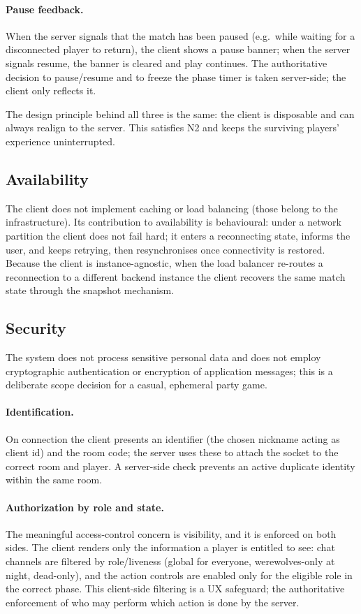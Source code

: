 \documentclass{scrartcl}
\begin{document}
\paragraph{Pause feedback.} When the server signals that the match has
been paused (e.g.\ while waiting for a disconnected player to return),
the client shows a pause banner; when the server signals resume, the
banner is cleared and play continues. The authoritative decision to
pause/resume and to freeze the phase timer is taken server-side; the
client only reflects it.

The design principle behind all three is the same: the client is
disposable and can always realign to the server. This satisfies N2 and
keeps the surviving players' experience uninterrupted.

\subsection{Availability}\label{availability}

The client does not implement caching or load balancing (those belong to
the infrastructure). Its contribution to availability is behavioural:
under a network partition the client does not fail hard; it enters a
reconnecting state, informs the user, and keeps retrying, then
resynchronises once connectivity is restored. Because the client is
instance-agnostic, when the load balancer re-routes a reconnection to a
different backend instance the client recovers the same match state
through the snapshot mechanism.

\subsection{Security}\label{security}

The system does not process sensitive personal data and does not employ
cryptographic authentication or encryption of application messages; this
is a deliberate scope decision for a casual, ephemeral party game.

\paragraph{Identification.} On connection the client presents an
identifier (the chosen nickname acting as client id) and the room code;
the server uses these to attach the socket to the correct room and
player. A server-side check prevents an active duplicate identity within
the same room.

\paragraph{Authorization by role and state.} The meaningful
access-control concern is visibility, and it is enforced on both sides.
The client renders only the information a player is entitled to see:
chat channels are filtered by role/liveness (global for everyone,
werewolves-only at night, dead-only), and the action controls are
enabled only for the eligible role in the correct phase. This
client-side filtering is a UX safeguard; the authoritative enforcement
of who may perform which action is done by the server.
\end{document}
